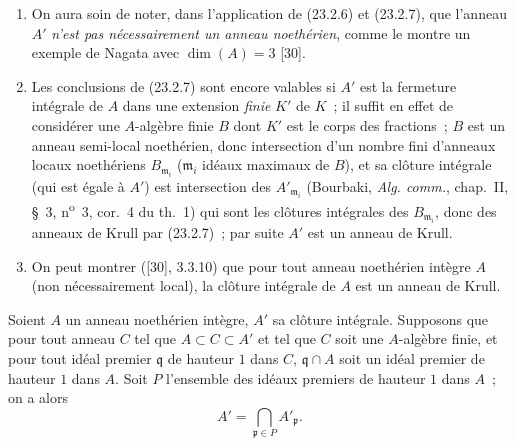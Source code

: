 \begin{remarks}[23.2.8]
\label{0.23.2.8-fr}
\begin{enumerate}
  \item[(i)] On aura soin de noter, dans l'application de (23.2.6) et
  (23.2.7), que l'anneau $A'$ \emph{n'est pas nécessairement un anneau
  noethérien}, comme le montre un exemple de Nagata avec $\dim(A)=3$ [30].

  \item[(ii)] Les conclusions de (23.2.7) sont encore valables si $A'$ est
  la fermeture intégrale de $A$ dans une extension \emph{finie} $K'$ de $K$~; il
  suffit en effet de considérer une $A$-algèbre finie $B$ dont $K'$ est le
  corps des fractions~; $B$ est un anneau semi-local noethérien, donc
  intersection d'un nombre fini d'anneaux locaux noethériens
  $B_{\mathfrak m_i}$ ($\mathfrak m_i$ idéaux maximaux de $B$), et sa clôture
  intégrale (qui est égale à $A'$) est intersection des
  $A'_{\mathfrak m_i}$ (Bourbaki, \emph{Alg. comm.}, chap.~II, §~3,
  n\textsuperscript{o}~3, cor.~4 du th.~1) qui sont les clôtures intégrales
  des $B_{\mathfrak m_i}$, donc des anneaux de Krull par (23.2.7)~; par
  suite $A'$ est un anneau de Krull.

  \item[(iii)] On peut montrer ([30], 3.3.10) que pour tout anneau noethérien
  intègre $A$ (non nécessairement local), la clôture intégrale de $A$ est un
  anneau de Krull.
\end{enumerate}
\end{remarks}

\begin{corollary}[23.2.9]
\label{0.23.2.9-fr}
Soient $A$ un anneau noethérien intègre, $A'$ sa clôture intégrale. Supposons
que pour tout anneau $C$ tel que $A\subset C\subset A'$ et tel que $C$ soit
une $A$-algèbre finie, et pour tout idéal premier $\mathfrak q$ de hauteur $1$
dans $C$, $\mathfrak q\cap A$ soit un idéal premier de hauteur $1$ dans $A$.
Soit $P$ l'ensemble des idéaux premiers de hauteur $1$ dans $A$~; on a alors
\[
  A'=\bigcap_{\mathfrak p\in P}A'_{\mathfrak p}.
\]
\end{corollary}

